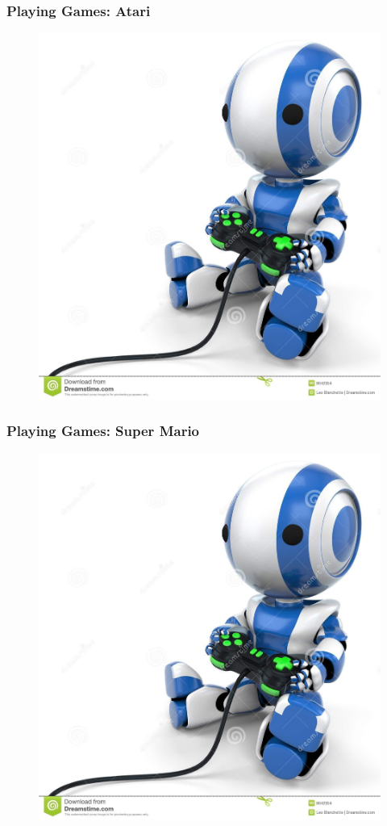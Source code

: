 \documentclass{beamer}
\begin{document}

\begin{frame}\frametitle{Playing Games: Atari}\small
\begin{figure}
\href{run:videos/intro/deep_mind.mp4}{
\includegraphics[width =0.6\linewidth,trim=0 69 0 0,clip]{Figures/robot_game.jpg}\\
{}
}
\end{figure}
\end{frame}

\begin{frame}\frametitle{Playing Games: Super Mario}\small
\begin{figure}
\href{run:videos/intro/super_mario.mp4}{
\includegraphics[width =0.6\linewidth,trim=0 69 0 0,clip]{Figures/robot_game.jpg}\\
{}
}
\end{figure}
\end{frame}
\end{document}
